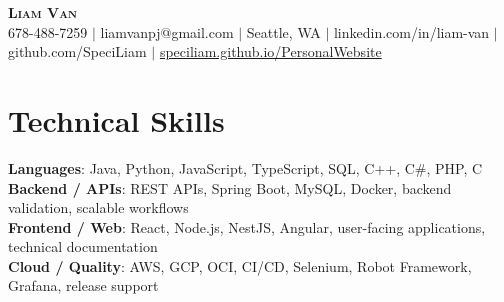 \documentclass[letterpaper,11pt]{article}
\begin{document}

%
\begin{center}
    \textbf{\Huge \scshape Liam Van} \\ \vspace{1pt}
    \small 678-488-7259 $|$ \small {liamvanpj@gmail.com} $|$ Seattle, WA
 {{$|$ linkedin.com/in/liam-van} {$|$ github.com/SpeciLiam} {$|$ \href{https://speciliam.github.io/PersonalWebsite}{speciliam.github.io/PersonalWebsite}}}

\end{center}

\section{Technical Skills}
 \begin{itemize}[leftmargin=0.15in, label={}]
    \small{\item{
     \textbf{Languages}{: Java, Python, JavaScript, TypeScript, SQL, C++, C\#, PHP, C} \\
     \textbf{Backend / APIs}{: REST APIs, Spring Boot, MySQL, Docker, backend validation, scalable workflows} \\
     \textbf{Frontend / Web}{: React, Node.js, NestJS, Angular, user-facing applications, technical documentation} \\
     \textbf{Cloud / Quality}{: AWS, GCP, OCI, CI/CD, Selenium, Robot Framework, Grafana, release support} \\
    }}
 \end{itemize}
%

\end{document}
